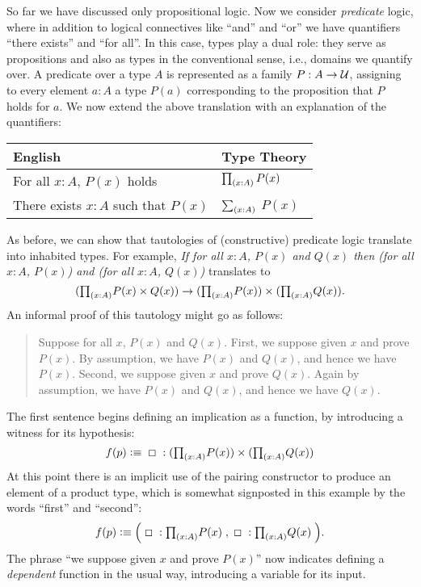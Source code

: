 So far we have discussed only propositional logic.
Now we consider \emph{predicate} logic, where in addition to logical connectives like ``and'' and ``or'' we have quantifiers ``there exists'' and ``for all''.
In this case, types play a dual role: they serve as propositions and also as types in the conventional sense, i.e., domains we quantify over.
A predicate over a type $A$ is represented as a family $P : A \to \mathcal{U}$, assigning to every element $a : A$ a type $P(a)$ corresponding to the proposition that $P$ holds for $a$. We now extend the above translation with an explanation of the quantifiers:
\begin{center}
  \medskip
  \begin{tabular}{ll}
    \toprule
    English & Type Theory\\
    \midrule
    For all $x:A$, $P(x)$ holds & $\prd{x:A} P(x)$ \\
    There exists $x:A$ such that $P(x)$ & $\sm{x:A}$ $P(x)$ \\
    \bottomrule
  \end{tabular}
  \medskip
\end{center}
As before, we can show that tautologies of (constructive) predicate logic translate into inhabited types.
For example, \emph{If for all $x:A$, $P(x)$ and $Q(x)$ then (for all $x:A$, $P(x)$) and (for all $x:A$, $Q(x)$)} translates to
\[ (\tprd{x:A} P(x) \times Q(x)) \to (\tprd{x:A} P(x)) \times (\tprd{x:A} Q(x)). \]
An informal proof of this tautology might go as follows:
\begin{quote}
  Suppose for all $x$, $P(x)$ and $Q(x)$.
  First, we suppose given $x$ and prove $P(x)$.
  By assumption, we have $P(x)$ and $Q(x)$, and hence we have $P(x)$.
  Second, we suppose given $x$ and prove $Q(x)$.
  Again by assumption, we have $P(x)$ and $Q(x)$, and hence we have $Q(x)$.
\end{quote}
The first sentence begins defining an implication as a function, by introducing a witness for its hypothesis:
\[ f(p) \defeq \;\Box\; : (\tprd{x:A} P(x)) \times (\tprd{x:A} Q(x)) \]
At this point there is an implicit use of the pairing constructor to produce an element of a product type, which is somewhat signposted in this example by the words ``first'' and ``second'':
\[ f(p) \defeq \Big( \;\Box\; : \tprd{x:A} P(x) \;,\; \Box\; : \tprd{x:A}Q(x) \;\Big). \]
The phrase ``we suppose given $x$ and prove $P(x)$'' now indicates defining a \emph{dependent} function in the usual way, introducing a variable for its input.
